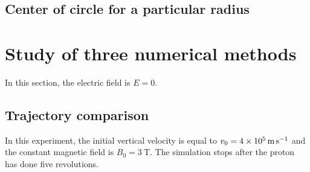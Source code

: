 \documentclass[a4paper,12pt,twoside]{article}
\begin{document}
\subsection{Center of circle for a particular radius}

\section{Study of three numerical methods}
In this section, the electric field is $E = 0$.
\subsection{Trajectory comparison}
In this experiment, the initial vertical velocity is equal to $v_0 = \SI{4d5}{\meter\per\second}$ and the constant magnetic field is $B_0 = \SI{3}{\tesla}$.
The simulation stops after the proton has done five revolutions.\\
\end{document}
